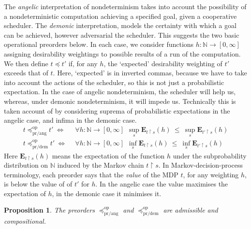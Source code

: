 \documentclass[a4paper,UKenglish]{lipics-v2018}
\newcommand{\Basicleq}{\preccurlyeq}
\newcommand{\prang}{\text{pr/ang}}
\newcommand{\prdem}{\text{pr/dem}}
\newcommand{\Op}{\text{op}}
\theoremstyle{plain}
\newtheorem{proposition}[theorem]{Proposition}
\begin{document}

The  \emph{angelic} interpretation of nondeterminism takes into account the possibility of a nondeterministic computation achieving a specified goal, given a cooperative scheduler.  The  \emph{demonic} interpretation, 
models the {certainty} with which a goal can be achieved, however adversarial the scheduler. 
This suggests the  two  basic operational preorders below. 
In each case, we consider functions $h \colon \mathbb{N} \to [0,\infty]$ assigning desirability weightings to possible results of a run of the computation. We then define 
$t \Basicleq t'$ if, for any $h$, the `expected' desirability weighting of $t'$ exceeds that of $t$. Here, `expected' is in inverted commas, because we have to take into account the actions of the scheduler, so this is not just a probabilistic expectation. In the case of 
angelic nondeterminism, the scheduler will help us, whereas, under demonic nondeterminism, it will impede us.
Technically this is taken account of by considering suprema of probabilistic expectations in the angelic case, and infima in the demonic case.
\begin{align*}
t \Basicleq^\Op_\prang t' ~ \Leftrightarrow ~ ~& \forall h \colon \mathbb{N} \to [0,\infty]~~ \sup_s  \mathbf{E}_{t\restriction\!s} (h)~ \leq~ \sup_s \mathbf{E}_{t'\restriction s} (h)
\\
t \Basicleq^\Op_\prdem t' ~ \Leftrightarrow ~ ~& \forall h \colon \mathbb{N} \to [0,\infty]~~ \inf_s  \mathbf{E}_{t\restriction s} (h)~ \leq~ \inf_s \mathbf{E}_{t'\restriction s} (h)
\end{align*}
Here $\mathbf{E}_{t\restriction\!s} (h)$ means the expectation of the function $h$ under the subprobability distribution on $\mathbb{N}$ induced by the Markov chain $t  \restriction\! s$.
In Markov-decision-process terminology, each preorder says that the \emph{value} of the MDP $t$, for any weighting $h$, is below the value of of $t'$ for $h$. In the angelic case the value maximises the expectation of $h$, in the demonic case it minimises it. 
\begin{proposition}
The preorders $\Basicleq^\Op_\prang$ and $\Basicleq^\Op_\prdem$ are admissible and compositional.
\end{proposition}
\end{document}
